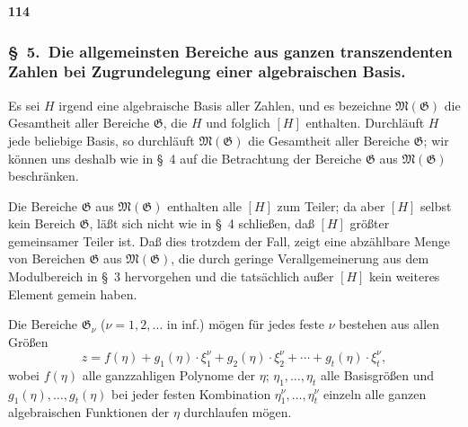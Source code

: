 \documentclass[12pt,a4paper]{article}
\begin{document}
\newpage
\begin{center}
\textbf{114}
\end{center}

\subsubsection*{\S\ 5.\ Die allgemeinsten Bereiche aus ganzen transzendenten Zahlen bei Zugrundelegung einer algebraischen Basis.}

Es sei $H$ irgend eine algebraische Basis aller Zahlen, und es bezeichne $\mathfrak{M}(\mathfrak{G})$ die Gesamtheit aller Bereiche $\mathfrak{G}$, die $H$ und folglich $[H]$ enthalten. Durchl\"auft $H$ jede beliebige Basis, so durchl\"auft $\mathfrak{M}(\mathfrak{G})$ die Gesamtheit aller Bereiche $\mathfrak{G}$; wir k\"onnen uns deshalb wie in \S\ 4 auf die Betrachtung der Bereiche $\mathfrak{G}$ aus $\mathfrak{M}(\mathfrak{G})$ beschr\"anken.

Die Bereiche $\mathfrak{G}$ aus $\mathfrak{M}(\mathfrak{G})$ enthalten alle $[H]$ zum Teiler; da aber $[H]$ selbst kein Bereich $\mathfrak{G}$, l\"a\ss t sich nicht wie in \S\ 4 schlie\ss en, da\ss{} $[H]$ gr\"o\ss ter gemeinsamer Teiler ist. Da\ss{} dies trotzdem der Fall, zeigt eine abz\"ahlbare Menge von Bereichen $\mathfrak{G}$ aus $\mathfrak{M}(\mathfrak{G})$, die durch geringe Verallgemeinerung aus dem Modulbereich in \S\ 3 hervorgehen und die tats\"achlich au\ss er $[H]$ kein weiteres Element gemein haben.

Die Bereiche $\mathfrak{G}_{\nu}$ ($\nu = 1, 2, \ldots$ in inf.) m\"ogen f\"ur jedes feste $\nu$ bestehen aus allen Gr\"o\ss en
\begin{equation}\tag{1}
z = f(\eta) + g_1(\eta) \cdot \xi_1^{\nu} + g_2(\eta) \cdot \xi_2^{\nu} + \cdots + g_t(\eta) \cdot \xi_t^{\nu},
\end{equation}
wobei $f(\eta)$ alle ganzzahligen Polynome der $\eta$; $\eta_1, \ldots, \eta_t$ alle Basisgr\"o\ss en und $g_1(\eta), \ldots, g_t(\eta)$ bei jeder festen Kombination $\eta_1^{\nu}, \ldots, \eta_t^{\nu}$ einzeln alle ganzen algebraischen Funktionen der $\eta$ durchlaufen m\"ogen.
\end{document}
